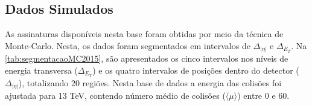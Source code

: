

\subsection{Dados Simulados}



As assinaturas disponíveis nesta base foram obtidas por meio da técnica de Monte-Carlo. Nesta, os dados foram segmentados em intervalos de $\Delta_{|\eta|}$ e $\Delta_{E_T}$. Na \autoref{tab:segmentacaoMC2015}, são apresentados os cinco intervalos nos níveis de energia transversa ($\Delta_{E_T}$) e os quatro intervalos de posições dentro do detector ($\Delta_{|\eta|}$), totalizando 20 regiões. Nesta base de dados a energia das colisões foi ajustada para 13 TeV, contendo número médio de colisões ($\langle\mu\rangle$) entre 0 e 60. 


